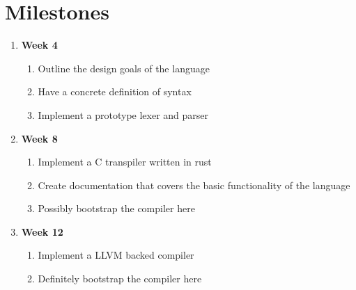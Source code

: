 \documentclass{article}
\begin{document}
\section*{Milestones}

\begin{enumerate}
\item
  \textbf{Week 4}

  \begin{enumerate}
  \item
    Outline the design goals of the language
  \item
    Have a concrete definition of syntax
  \item
    Implement a prototype lexer and parser
  \end{enumerate}

\item
  \textbf{Week 8}

  \begin{enumerate}
  \item
    Implement a C transpiler written in rust
  \item
    Create documentation that covers the basic functionality of the language
  \item
    Possibly bootstrap the compiler here
  \end{enumerate}

\item
  \textbf{Week 12}

  \begin{enumerate}
  \item
    Implement a LLVM backed compiler
  \item
    Definitely bootstrap the compiler here
  \end{enumerate}
\end{enumerate}
\end{document}
